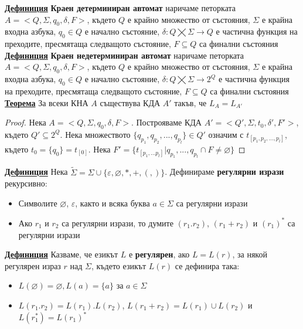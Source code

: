 \documentclass{article}
\begin{document}
\textbf{\underline{Дефиниция}}
\textbf{Краен детерминиран автомат} наричаме петорката \newline $A = <Q, \Sigma, q_0, \delta, F>$, където
$Q$ е крайно множество от състояния, $\Sigma$ е крайна входна азбука, $q_0 \in Q$ е начално състояние,
$\delta : Q \bigtimes \Sigma \rightarrow Q$ е частична функция на преходите, пресмятаща следващото състояние,
$F \subseteq Q$ са финални състояния \newline\newline
\textbf{\underline{Дефиниция}}
\textbf{Краен недетерминиран автомат} наричаме петорката \newline $A = <Q, \Sigma, q_0, \delta, F>$, където
$Q$ е крайно множество от състояния, $\Sigma$ е крайна входна азбука, $q_0 \in Q$ е начално състояние,
$\delta : Q \bigtimes \Sigma \rightarrow 2^Q$ е частична функция на преходите, пресмятаща следващото състояние,
$F \subseteq Q$ са финални състояния \newline\newline
\textbf{\underline{Теорема}} \newline
За всеки КНА $A$ съществува КДА $A'$ такъв, че $L_A = L_{A'}$
\begin{proof}
Нека $A = <Q, \Sigma, q_0, \delta, F>$. Построяваме КДА $A' = <Q', \Sigma, t_0, \delta', F'>$, където $Q' \subseteq 2^Q$. Нека множеството
$\{q_{p_1}, q_{p_2}, ..., q_{p_l}\} \in Q'$ означим с $t_{[p_1, p_2, ..., p_l]}$, където $t_0 = \{q_0\} = t_{[0]}$. Нека $F' =
\{t_{[p_1,...p_l]} | {q_{p_1}, ..., q_{p_l} \cap F \neq \varnothing}\}$ 
\end{proof}
\textbf{\underline{Дефиниция}}
Нека $\widetilde{\Sigma} = \Sigma \cup \{\varepsilon, \varnothing, *, +, (, )\}$. Дефинираме \textbf{регулярни изрази} рекурсивно:
\begin{itemize}
    \item Символите $\varnothing$, $\varepsilon$, както и всяка буква $a \in \Sigma$ са регулярни изрази
    \item Ако $r_1$ и $r_2$ са регулярни изрази, то думите $(r_1 . r_2)$, $(r_1 + r_2)$ и $(r_1)^*$ са регулярни изрази
\end{itemize}
\textbf{\underline{Дефиниция}}
Казваме, че езикът $L$ е \textbf{регулярен}, ако $L = L(r)$, за някой регулярен израз $r$ над $\Sigma$, където езикът $L(r)$ се
дефинира така:
\begin{itemize}
    \item $L(\varnothing) = \varnothing, L(a) = \{a\}$ за $a \in \Sigma$
    \item $L(r_1 . r_2) = L(r_1) . L(r_2)$, $L(r_1 + r_2) = L(r_1) \cup L(r_2)$ и $L(r_1^*) = L(r_1)^*$
\end{itemize}
\end{document}
